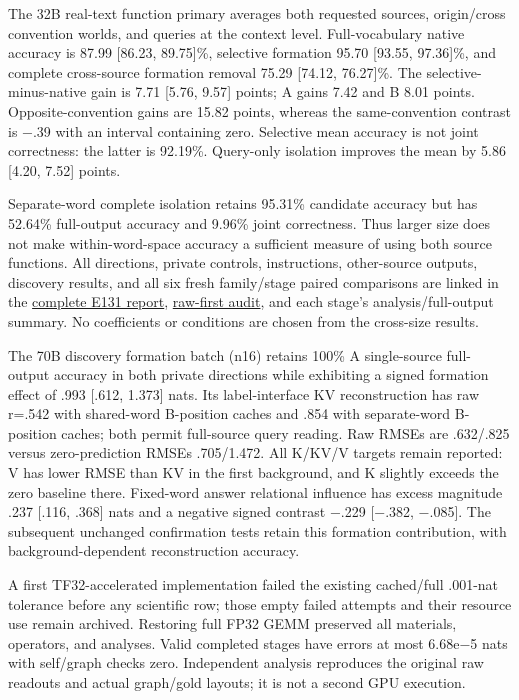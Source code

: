 \documentclass[11pt]{article}
\begin{document}
The 32B real-text function primary averages both requested sources, origin/cross convention worlds, and queries at the context level. Full-vocabulary native accuracy is 87.99 {[}86.23, 89.75{]}\%, selective formation 95.70 {[}93.55, 97.36{]}\%, and complete cross-source formation removal 75.29 {[}74.12, 76.27{]}\%. The selective-minus-native gain is 7.71 {[}5.76, 9.57{]} points; A gains 7.42 and B 8.01 points. Opposite-convention gains are 15.82 points, whereas the same-convention contrast is −.39 with an interval containing zero. Selective mean accuracy is not joint correctness: the latter is 92.19\%. Query-only isolation improves the mean by 5.86 {[}4.20, 7.52{]} points.

Separate-word complete isolation retains 95.31\% candidate accuracy but has 52.64\% full-output accuracy and 9.96\% joint correctness. Thus larger size does not make within-word-space accuracy a sufficient measure of using both source functions. All directions, private controls, instructions, other-source outputs, discovery results, and all six fresh family/stage paired comparisons are linked in the \href{results/e131/report.md}{complete E131 report}, \href{results/e131/independent_raw_review_2026-10-12.md}{raw-first audit}, and each stage's analysis/full-output summary. No coefficients or conditions are chosen from the cross-size results.

The 70B discovery formation batch (n16) retains 100\% A single-source full-output accuracy in both private directions while exhibiting a signed formation effect of .993 {[}.612, 1.373{]} nats. Its label-interface KV reconstruction has raw r=.542 with shared-word B-position caches and .854 with separate-word B-position caches; both permit full-source query reading. Raw RMSEs are .632/.825 versus zero-prediction RMSEs .705/1.472. All K/KV/V targets remain reported: V has lower RMSE than KV in the first background, and K slightly exceeds the zero baseline there. Fixed-word answer relational influence has excess magnitude .237 {[}.116, .368{]} nats and a negative signed contrast −.229 {[}−.382, −.085{]}. The subsequent unchanged confirmation tests retain this formation contribution, with background-dependent reconstruction accuracy.

A first TF32-accelerated implementation failed the existing cached/full .001-nat tolerance before any scientific row; those empty failed attempts and their resource use remain archived. Restoring full FP32 GEMM preserved all materials, operators, and analyses. Valid completed stages have errors at most 6.68e−5 nats with self/graph checks zero. Independent analysis reproduces the original raw readouts and actual graph/gold layouts; it is not a second GPU execution.
\end{document}
